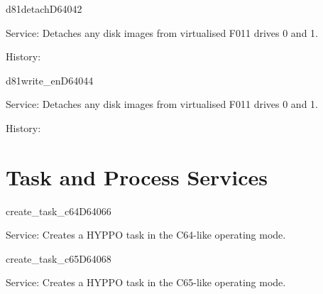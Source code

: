 \newpage
\begin{hyppotrap}{d81detach}{D640}{42}
\item [Service:]
  Detaches any disk images from virtualised F011 drives 0 and 1.
\item [History:]
\end{hyppotrap}


%
\newpage
\begin{hyppotrap}{d81write\_en}{D640}{44}
\item [Service:]
  Detaches any disk images from virtualised F011 drives 0 and 1.
\item [History:]
\end{hyppotrap}



\newpage
\section{Task and Process Services}


\begin{hyppotrap}{create\_task\_c64}{D640}{66}
\item [Service:]
  Creates a HYPPO task in the C64-like operating mode.
\notimplemented
\end{hyppotrap}


\begin{hyppotrap}{create\_task\_c65}{D640}{68}
\item [Service:]
  Creates a HYPPO task in the C65-like operating mode.
\notimplemented
\end{hyppotrap}


